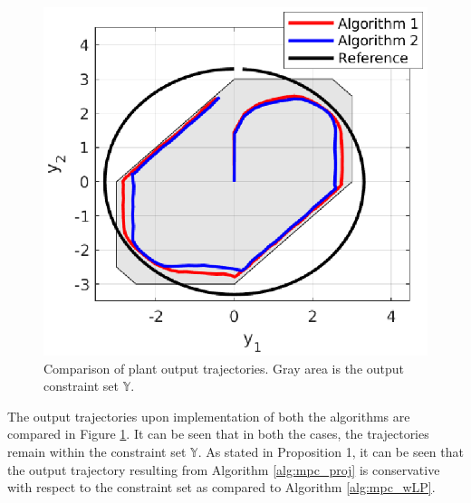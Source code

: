 \documentclass[letterpaper, 10 pt, conference]{ieeeconf}  %
\begin{document}
	\begin{figure}[h]
		\vspace{-3pt}
		\hspace{20pt}
		\includegraphics[scale=0.6]{output_performance.eps}
		\caption{Comparison of plant output trajectories. Gray area is the output constraint set $\mathbb{Y}$.}
		\label{fig:y_trajectories}
	\end{figure} 
	\vspace{-8pt} 
The output trajectories upon implementation of both the algorithms are compared in Figure \ref{fig:y_trajectories}. It can be seen that in both the cases, the trajectories remain within the constraint set $\mathbb{Y}$. As stated in Proposition 1, it can be seen that the output trajectory resulting from Algorithm \ref{alg:mpc_proj} is conservative with respect to the constraint set as compared to Algorithm \ref{alg:mpc_wLP}. 
\end{document}
